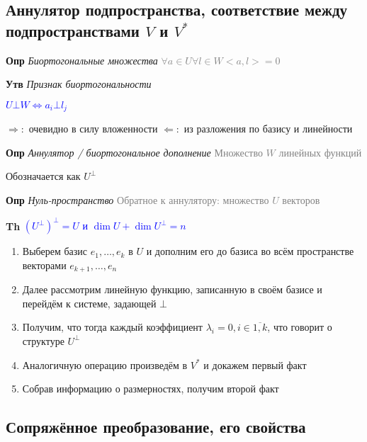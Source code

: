\documentclass[a4paper, 14pt]{article}
\begin{document}
    \subsection{Аннулятор подпространства, соответствие между подпространствами $V$ и $V^*$}
    
    \textbf{Опр} \textit{Биортогональные множества} \textcolor{gray}{$\forall a \in U \forall l \in W <a, l> = 0$}
    
    \textbf{Утв} \textit{Признак биортогональности}
    
    \textcolor{blue}{$U \bot W \Leftrightarrow a_i \bot l_j$}
    
    $\Rightarrow:$ очевидно в силу вложенности
    $\Leftarrow:$ из разложения по базису и линейности
    
    \textbf{Опр} \textit{Аннулятор / биортогональное дополнение} \textcolor{gray}{Множество $W$ линейных функций}
    
    Обозначается как $U^\bot$

    
    \textbf{Опр} \textit{Нуль-пространство} \textcolor{gray}{Обратное к аннулятору: множество $U$ векторов}

    
    \textbf{Th} \textcolor{blue}{$(U^\bot)^\bot = U$ и $\dim U + \dim U^\bot = n$}
    
    \begin{enumerate}
        \item Выберем базис $e_1, \dots, e_k$ в $U$ и дополним его до базиса во всём пространстве векторами $e_{k+1},
        \dots, e_n$
        \item Далее рассмотрим линейную функцию, записанную в своём базисе и перейдём к системе, задающей $\bot$
        \item Получим, что тогда каждый коэффициент $\lambda_i = 0, i \in \overline{1, k}$, что говорит о структуре $
        U^\bot$
        \item Аналогичную операцию произведём в $V^*$ и докажем первый факт
        \item Собрав информацию о размерностях, получим второй факт
    \end{enumerate}
    
    \subsection{Сопряжённое преобразование, его свойства}
    
\end{document}

